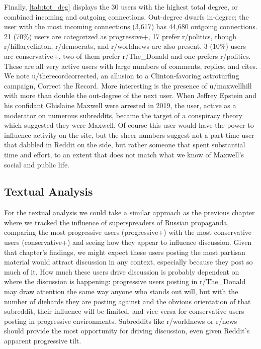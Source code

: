 \documentclass[doublespacing]{utdthesis}
\begin{document}
Finally, \ref{tab:tot_deg} displays the 30 users with the highest total degree, or combined incoming and outgoing connections.
Out-degree dwarfs in-degree; the user with the most incoming connections (3,617) has 44,680 outgoing connections.
21 (70\%) users are categorized as progressive+, 17 prefer r/politics, though r/hillaryclinton, r/democrats, and r/worldnews are also present.
3 (10\%) users are conservative+, two of them prefer r/The\_Donald and one prefers r/politics.
These are all very active users with large numbers of comments, replies, and cites.
We note u/therecordcorrected, an allusion to a Clinton-favoring astroturfing campaign, Correct the Record.
More interesting is the presence of u/maxwellhill with more than double the out-degree of the next user.
When Jeffrey Epstein and his confidant Ghislaine Maxwell were arrested in 2019, the user, active as a moderator on numerous subreddits, became the target of a conspiracy theory which suggested they were Maxwell.
Of course this user would have the power to influence activity on the site, but the sheer numbers suggest not a part-time user that dabbled in Reddit on the side, but rather someone that spent substantial time and effort, to an extent that does not match what we know of Maxwell's social and public life.

\subsection{Textual Analysis}

For the textual analysis we could take a similar approach as the previous chapter where we tracked the influence of superspreaders of Russian propaganda, comparing the most progressive users (progressive+) with the most conservative users (conservative+) and seeing how they appear to influence discussion.
Given that chapter's findings, we might expect these users posting the most partisan material would attract discussion in any context, especially because they post so much of it.
How much these users drive discussion is probably dependent on where the discussion is happening: progressive users posting in r/The\_Donald may draw attention the same way anyone who stands out will, but with the number of diehards they are posting against and the obvious orientation of that subreddit, their influence will be limited, and vice versa for conservative users posting in progressive environments.
Subreddits like r/worldnews or r/news should provide the most opportunity for driving discussion, even given Reddit's apparent progressive tilt.
\end{document}
